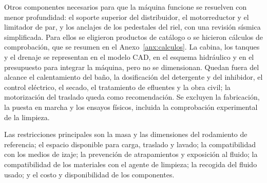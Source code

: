 Otros componentes necesarios para que la máquina funcione se resuelven con menor profundidad: el soporte superior del distribuidor, el motorreductor y el limitador de par, y los anclajes de los pedestales del riel, con una revisión sísmica simplificada. Para ellos se eligieron productos de catálogo o se hicieron cálculos de comprobación, que se resumen en el Anexo~\ref{anx:calculos}. La cabina, los tanques y el drenaje se representan en el modelo CAD, en el esquema hidráulico y en el presupuesto para integrar la máquina, pero no se dimensionan. Quedan fuera del alcance el calentamiento del baño, la dosificación del detergente y del inhibidor, el control eléctrico, el secado, el tratamiento de efluentes y la obra civil; la motorización del traslado queda como recomendación. Se excluyen la fabricación, la puesta en marcha y los ensayos físicos, incluida la comprobación experimental de la limpieza.

Las restricciones principales son la masa y las dimensiones del rodamiento de referencia; el espacio disponible para carga, traslado y lavado; la compatibilidad con los medios de izaje; la prevención de atrapamientos y exposición al fluido; la compatibilidad de los materiales con el agente de limpieza; la recogida del fluido usado; y el costo y disponibilidad de los componentes.
